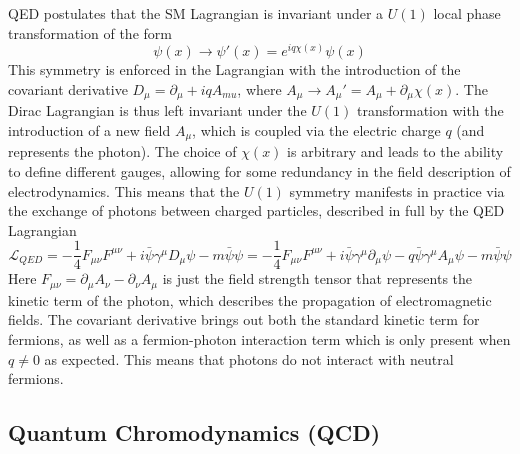 QED postulates that the SM Lagrangian is invariant under a $U(1)$ local phase transformation of the form 
\begin{equation}
\psi(x) \rightarrow \psi'(x) = e^{iq\chi(x)}\psi(x)
\end{equation}
This symmetry is enforced in the Lagrangian with the introduction of the covariant derivative 
$D_{\mu} = \partial_{\mu} + iqA_{mu}$, where $A_{\mu} \rightarrow A_{\mu}' = A_{\mu} + \partial_{\mu}\chi(x)$. 
The Dirac Lagrangian is thus left invariant under the $U(1)$ transformation with the introduction of a new 
field $A_{\mu}$, which is coupled via the electric charge $q$ (and represents the photon). The choice of $\chi(x)$ 
is arbitrary and leads to the ability to define different gauges, allowing for some redundancy in the field 
description of electrodynamics. This means that the $U(1)$ symmetry manifests in practice via the exchange 
of photons between charged particles, described in full by the QED Lagrangian
\begin{equation}
\mathcal{L}_{QED} = - \frac{1}{4}F_{\mu\nu}F^{\mu\nu} + i\bar{\psi}\gamma^{\mu}D_{\mu}\psi - m\bar{\psi}\psi =
- \frac{1}{4}F_{\mu\nu}F^{\mu\nu} + i\bar{\psi}\gamma^{\mu}\partial_{\mu}\psi - q\bar{\psi}\gamma^{\mu}A_{\mu}\psi - m\bar{\psi}\psi
\end{equation}
Here $F_{\mu\nu} = \partial_{\mu}A_{\nu}  - \partial_{\nu}A_{\mu}$ is just the field strength tensor that represents 
the kinetic term of the photon, which describes the propagation of electromagnetic fields. The covariant derivative 
brings out both the standard kinetic term for fermions, as well as a fermion-photon interaction term which is only 
present when $q \neq 0$ as expected.  This means that photons do not interact with neutral fermions.

\subsection{Quantum Chromodynamics (QCD)}

